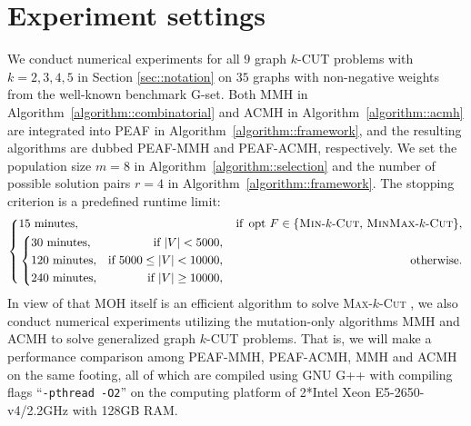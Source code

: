 \documentclass[12pt, a4paper]{article}%
\DeclareMathOperator*{\opt}{\ensuremath{opt}}
\numberwithin{equation}{section}
\theoremstyle{plain}
\begin{document}
			\section{Experiment settings}
			\label{sec::experiment}
			
			
			We conduct numerical experiments for all $9$ graph $k$-CUT problems with $k=2,3,4,5$ in Section \ref{sec::notation}
			on $35$ graphs with non-negative weights from the well-known benchmark G-set.
            Both MMH in Algorithm~\ref{algorithm::combinatorial} and ACMH in Algorithm~\ref{algorithm::acmh} are integrated into PEAF in Algorithm~\ref{algorithm::framework},
			and the resulting algorithms are dubbed PEAF-MMH and PEAF-ACMH, respectively. 
			We set the population size $m=8$ in Algorithm~\ref{algorithm::selection} and the number of possible solution pairs $r=4$ in Algorithm~\ref{algorithm::framework}.  
			The stopping criterion is a predefined runtime limit:
			\begin{equation}\label{eq:timelimit}\left\{
				\begin{aligned}
					&15\text{ minutes},&\text{if }\opt\,F\in\{\text{\textsc{Min}-$k$-\textsc{Cut}, \textsc{MinMax}-$k$-\textsc{Cut}}\},\\
					&\left\{
					\begin{aligned}
						&30\text{ minutes}, &\text{if }|V|< 5000,\\
						&120\text{ minutes},&\text{if }5000\leq |V|< 10000,\\
						&240\text{ minutes}, &\text{if }|V|\geq 10000,
					\end{aligned}
					\right.
					&\text{otherwise.}
				\end{aligned}
				\right.
			\end{equation}
			In view of that MOH itself is an efficient algorithm to solve \textsc{Max}-$k$-\textsc{Cut} \cite{Ma2015}, 
			we also conduct numerical experiments utilizing the mutation-only algorithms MMH and ACMH to solve generalized graph $k$-CUT problems.
			That is, we will make a performance comparison among PEAF-MMH, PEAF-ACMH, MMH and ACMH on the same footing,
			all of which are compiled using GNU G++ with compiling flags ``\texttt{-pthread -O2}'' on the computing platform of 2*Intel Xeon E5-2650-v4/2.2GHz with 128GB RAM.
\end{document}
